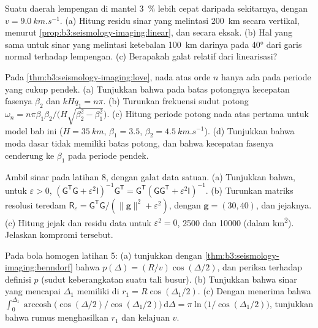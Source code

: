 \begin{exercise}[$\star\star$]\label{exo:b3:seismology-imaging:9}
Suatu daerah lempengan di mantel \qty{3}{\percent} lebih cepat daripada sekitarnya,
dengan $v = \qty{9.0}{km.s^{-1}}$. (a) Hitung residu sinar yang melintasi
\qty{200}{km} secara vertikal, menurut \cref{prop:b3:seismology-imaging:linear},
dan secara eksak. (b) Hal yang sama untuk sinar yang melintasi ketebalan \qty{100}{km} darinya pada
\ang{40} dari garis normal terhadap lempengan. (c) Berapakah galat relatif dari
linearisasi?
\end{exercise}

\begin{exercise}[$\star\star\star$]\label{exo:b3:seismology-imaging:10}
Pada \cref{thm:b3:seismology-imaging:love}, nada atas orde $n$ hanya ada
pada periode yang cukup pendek. (a) Tunjukkan bahwa pada batas potongnya kecepatan fasenya
$\beta_2$ dan $kHq_1 = n\pi$. (b) Turunkan frekuensi sudut potong
$\omega_n = n\pi\beta_1\beta_2/\bigl(H\sqrt{\beta_2^2 - \beta_1^2}\bigr)$.
(c) Hitung periode potong nada atas pertama untuk model bab ini
($H = \qty{35}{km}$, $\beta_1 = 3.5$, $\beta_2 = \qty{4.5}{km.s^{-1}}$).
(d) Tunjukkan bahwa moda dasar tidak memiliki batas potong, dan bahwa kecepatan fasenya
cenderung ke $\beta_1$ pada periode pendek.
\end{exercise}

\begin{exercise}[$\star\star\star$]\label{exo:b3:seismology-imaging:11}
Ambil sinar pada latihan 8, dengan galat data satuan. (a) Tunjukkan bahwa, untuk
$\varepsilon > 0$, $(\mathsf G^{\mathsf T}\mathsf G + \varepsilon^2\mathsf
I)^{-1}\mathsf G^{\mathsf T} = \mathsf G^{\mathsf T}(\mathsf G\mathsf
G^{\mathsf T} + \varepsilon^2\mathsf I)^{-1}$. (b) Turunkan
matriks resolusi teredam $\mathsf R_\varepsilon = \mathsf G^{\mathsf T}\mathsf G/(\|\mathbf g\|^2 +
\varepsilon^2)$, dengan $\mathbf g = (30, 40)$, dan jejaknya. (c) Hitung
jejak dan residu data untuk $\varepsilon^2 = 0$, 2500 dan \num{10000}
(dalam \unit{km^2}). Jelaskan kompromi tersebut.
\end{exercise}

\begin{exercise}[$\star\star\star$]\label{exo:b3:seismology-imaging:12}
Pada bola homogen latihan 5: (a) tunjukkan dengan
\cref{thm:b3:seismology-imaging:benndorf} bahwa $p(\Delta) = (R/v)\cos(\Delta/2)$,
dan periksa terhadap definisi $p$ (sudut keberangkatan suatu tali busur).
(b) Tunjukkan bahwa sinar yang mencapai $\Delta_1$ memiliki  di $r_1 = R\cos(\Delta_1/2)$.
(c) Dengan menerima bahwa $\int_0^{\Delta_1}\operatorname{arccosh}\bigl(\cos(\Delta/2)
/\cos(\Delta_1/2)\bigr)\,\mathrm d\Delta = \pi\ln\bigl(1/\cos(\Delta_1/2)\bigr)$,
tunjukkan bahwa rumus  menghasilkan $r_1$ dan kelajuan $v$.
\end{exercise}

